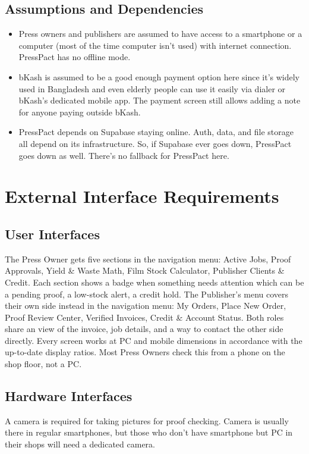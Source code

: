 \documentclass{scrreprt}
\begin{document}
\section{Assumptions and Dependencies}
\begin{itemize}
\item Press owners and publishers are assumed to have access to a smartphone or a computer (most of the time computer isn't used) with internet connection. PressPact has no offline mode.
\item bKash is assumed to be a good enough payment option here since it's widely used in Bangladesh and even elderly people can use it easily via dialer or bKash's dedicated mobile app. The payment screen still allows adding a note for anyone paying outside bKash.
\item PressPact depends on Supabase staying online. Auth, data, and file storage all depend on its infrastructure. So, if Supabase ever goes down, PressPact goes down as well. There's no fallback for PressPact here.
\end{itemize}

\chapter{External Interface Requirements}

\section{User Interfaces}
The Press Owner gets five sections in the navigation menu: Active Jobs, Proof Approvals, Yield \& Waste
Math, Film Stock Calculator, Publisher Clients \& Credit. Each section shows a badge when something needs
attention which can be a pending proof, a low-stock alert, a credit hold. The Publisher's menu covers
their own side instead in the navigation menu: My Orders, Place New Order, Proof Review Center, Verified Invoices, Credit \& Account Status. Both roles share an view of the invoice, job details, and a way to contact the other side directly.
Every screen works at PC and mobile dimensions in accordance with the up-to-date display ratios. Most Press Owners check this from a phone
on the shop floor, not a PC.

\section{Hardware Interfaces}
A camera is required for taking pictures for proof checking. Camera
is usually there in regular smartphones, but those who don't have smartphone but PC in their shops will need a dedicated camera.
\end{document}
